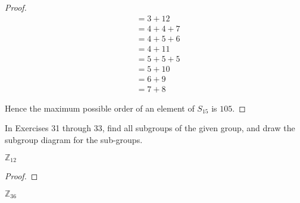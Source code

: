 \begin{proof}
\begin{align*}
           & = 3 + 12                                                              \\
           & = 4 + 4 + 7                                                           \\
           & = 4 + 5 + 6                                                           \\
           & = 4 + 11                                                              \\
           & = 5 + 5 + 5                                                           \\
           & = 5 + 10                                                              \\
           & = 6 + 9                                                               \\
           & = 7 + 8
    \end{align*}
    \endgroup

    Hence the maximum possible order of an element of $S_{15}$ is $105$.
\end{proof}

In Exercises 31 through 33, find all subgroups of the given group, and draw the subgroup diagram for the sub-groups.

\newpage
\begin{exercise}
    $\mathbb{Z}_{12}$
\end{exercise}

\begin{proof}
\end{proof}

\newpage
\begin{exercise}
    $\mathbb{Z}_{36}$
\end{exercise}

